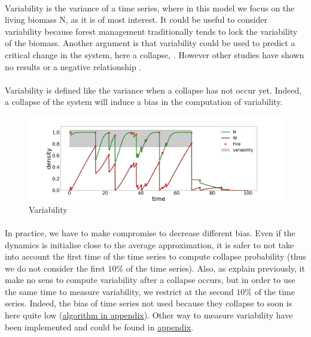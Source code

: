 \documentclass{article}
\begin{document}
\paragraph{}
Variability is the variance of a time series, where in this model we focus on the living biomass N, as it is of most interest. It could be useful to consider variability because forest management traditionally tends to lock the variability \citep{bergeron_natural_2002} of the biomass. Another argument is that variability could be used to predict a critical change in the system, here a collapse, \citep{karr_population_1982, pimm_risk_1988, bengtsson_predicting_1995}. However other studies have shown no results \citep{bengtsson_interspecific_1989, pollard_extinction_1992} or a negative relationship \citep{lima_extinction_1996}.





\paragraph{}
Variability is defined like the variance when a collapse has not occur yet. Indeed, a collapse of the system will induce a bias in the computation of variability.


\begin{figure}[h!]
\centering
\includegraphics[width=12.cm]{time_series_sd_1.png}
\caption{Variability}
\end{figure}



\paragraph{}
In practice, we have to make compromise to decrease different bias. Even if the dynamics is initialise close to the average approximation, it is safer to not take into account the first time of the time series to compute collapse probability (thus we do not consider the first $10\%$ of the time series). Also, as explain previously, it make no sens to compute variability after a collapse occurs, but in order to use the same time to measure variability, we restrict at the second $10\%$ of the time series. Indeed, the bias of time series not used because they collapse to soon is here quite low (\hyperref[algo_variability]{algorithm in appendix}). Other way to measure variability have been implemented and could be found in \hyperref[other_variability]{appendix}.
\end{document}
